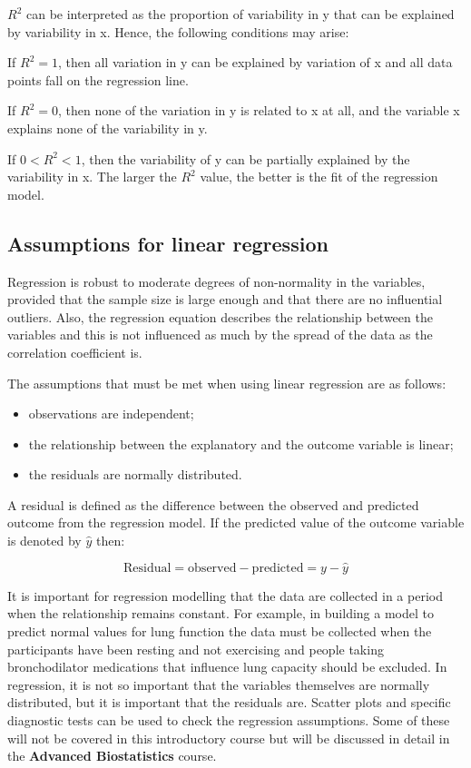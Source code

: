 \documentclass[
]{memoir}
\providecommand{\tightlist}{%
  \setlength{\itemsep}{0pt}\setlength{\parskip}{0pt}}
\begin{document}
\(R^2\) can be interpreted as the proportion of variability in y that can be explained by variability in x. Hence, the following conditions may arise:

If \(R^2 = 1\), then all variation in y can be explained by variation of x and all data points fall on the regression line.

If \(R^2 = 0\), then none of the variation in y is related to x at all, and the variable x explains none of the variability in y.

If \(0 < R^2 <1\), then the variability of y can be partially explained by the variability in x. The larger the \(R^2\) value, the better is the fit of the regression model.

\hypertarget{assumptions-for-linear-regression}{%
\subsection{Assumptions for linear regression}\label{assumptions-for-linear-regression}}

Regression is robust to moderate degrees of non-normality in the variables, provided that the sample size is large enough and that there are no influential outliers. Also, the regression equation describes the relationship between the variables and this is not influenced as much by the spread of the data as the correlation coefficient is.

The assumptions that must be met when using linear regression are as follows:

\begin{itemize}
\tightlist
\item
  observations are independent;
\item
  the relationship between the explanatory and the outcome variable is linear;
\item
  the residuals are normally distributed.
\end{itemize}

A residual is defined as the difference between the observed and predicted outcome from the regression model. If the predicted value of the outcome variable is denoted by \(\hat y\) then:

\[ \text{Residual} = \text{observed} - \text{predicted} = y - \hat y\]

It is important for regression modelling that the data are collected in a period when the relationship remains constant. For example, in building a model to predict normal values for lung function the data must be collected when the participants have been resting and not exercising and people taking bronchodilator medications that influence lung capacity should be excluded. In regression, it is not so important that the variables themselves are normally distributed, but it is important that the residuals are. Scatter plots and specific diagnostic tests can be used to check the regression assumptions. Some of these will not be covered in this introductory course but will be discussed in detail in the \textbf{Advanced Biostatistics} course.
\end{document}
